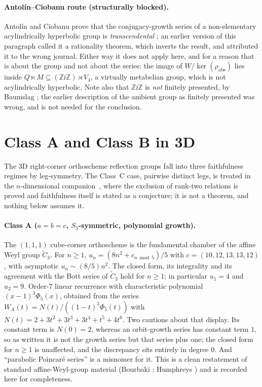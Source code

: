 \documentclass[11pt]{article}
\theoremstyle{plain}
\theoremstyle{definition}
\theoremstyle{remark}
\begin{document}
\paragraph{Antol\'in--Ciobanu route (structurally blocked).}
Antol\'in and Ciobanu prove that the conjugacy-growth series of a
non-elementary acylindrically hyperbolic group is \emph{transcendental}
\cite{AntolinCiobanu}; an earlier version of this paragraph called it a
rationality theorem, which inverts the result, and attributed it to the
wrong journal. Either way it does not apply here, and for a reason that
is about the group and not about the series: the image of
$W/\ker(\rho_{\mathrm{abs}})$ lies inside
$Q \ltimes M \subseteq (\mathbb{Z}\wr\mathbb{Z})\rtimes V_4$, a virtually
metabelian group, which is not acylindrically hyperbolic. Note also that
$\mathbb{Z}\wr\mathbb{Z}$ is \emph{not} finitely presented, by Baumslag
\cite{Baumslag1961}; the earlier description of the ambient group as finitely
presented was wrong, and is not needed for the conclusion.

\section{Class A and Class B in 3D}
\label{sec:classes-AB}

The 3D right-corner orthoscheme reflection groups fall into three
faithfulness regimes by leg-symmetry. The Class~C case, pairwise distinct
legs, is treated in the $n$-dimensional companion~\cite{Bonfioli1b},
where the exclusion of rank-two relations is proved and faithfulness
itself is stated as a conjecture; it is not a theorem, and nothing below
assumes it.

\paragraph{Class A ($a = b = c$, $S_3$-symmetric, polynomial growth).}
The $(1, 1, 1)$ cube-corner orthoscheme is the fundamental chamber of
the affine Weyl group $\widetilde{C}_3$.  For $n \ge 1$,
$u_n = (8 n^2 + c_{n \bmod 5})/5$ with $c = (10, 12, 13, 13, 12)$, with
asymptotic $u_n \sim (8/5) n^2$.  The closed form, its integrality and
its agreement with the Bott series of $\widetilde{C}_3$ hold for
$n \ge 1$; in particular $u_1 = 4$ and $u_2 = 9$. Order-$7$ linear
recurrence with characteristic polynomial $(x-1)^3 \Phi_5(x)$, obtained
from the series $W_A(t) = N(t) / ((1-t)^3 \Phi_5(t))$ with
$N(t) = 2 + 3t^2 + 3t^3 + 3t^4 + t^5 + 4t^6$. Two cautions about that
display. Its constant term is $N(0) = 2$, whereas an orbit-growth series
has constant term $1$, so as written it is not the growth series but
that series plus one; the closed form for $n \ge 1$ is unaffected, and
the discrepancy sits entirely in degree $0$. And ``parabolic Poincar\'e
series'' is a misnomer for it. This is a clean
restatement of standard affine-Weyl-group material (Bourbaki
\cite[Ch.~VI, \S4]{Bourbaki456}; Humphreys \cite[\S4.7]{Humphreys1990})
and is recorded here for completeness.
\end{document}
